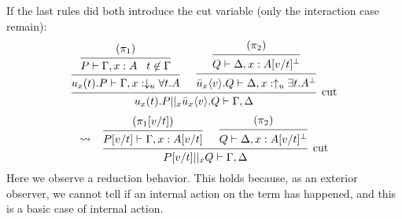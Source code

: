 \documentclass[a4paper,12pt]{article}
\begin{document}
\begin{myproof}
\begin{itemize}
\end{itemize}
If the last rules did both introduce the cut variable (only the interaction case remain):
\[
	\begin{prooftree}
				\hypo{(\pi_1)}
			\infer1{P \vdash \Gamma,x:A\;\;\; t\not\in\Gamma}
		\infer1{u_x(t).P \vdash \Gamma,x:\downarrow_u\forall t.A}
				\hypo{(\pi_2)}
			\infer1{Q \vdash \Delta,x:A[v/t]^\bot}
		\infer1{\bar{u}_x\langle v\rangle.Q \vdash \Delta,x:\uparrow_u\exists t.A^\bot}
	\infer2[cut]{u_x(t).P ||_x \bar{u}_x\langle v\rangle.Q \vdash \Gamma,\Delta}
	\end{prooftree}
\]\[
	\leadsto\;\;\;
	\begin{prooftree}
			\hypo{(\pi_1[v/t])}
		\infer1{P[v/t] \vdash \Gamma,x:A[v/t]}
			\hypo{(\pi_2)}
		\infer1{Q \vdash \Delta,x:A[v/t]^\bot}
	\infer2[cut]{P[v/t] ||_x Q \vdash \Gamma,\Delta}
	\end{prooftree}
\]
Here we observe a reduction behavior. This holds because, as an exterior observer, we cannot tell if an internal action on the term has happened, and this is a basic case of internal action.
\end{myproof}
\end{document}

